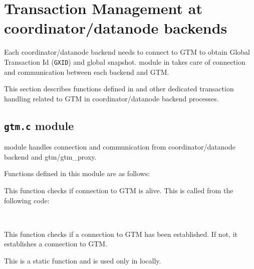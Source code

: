 %
%


\section{Transaction Management at coordinator/datanode backends}

  Each coordinator/datanode backend needs to connect to GTM to obtain Global Transaction
  Id (\texttt{GXID}) and global snapshot.
   module in  takes care of connection and
  communication between each backend and GTM.
  
  This section describes functions defined in  and other dedicated transaction
  handling related to GTM in coordinator/datanode backend processes.
  


\subsection{\texttt{gtm.c} module}
  
   module handles connection and communication from coordinator/datanode
  backend and gtm/gtm\_proxy.
  
  Functions defined in this module are as follows:
  
  
      This function checks if connection to GTM is alive.
	  This is called from the following code:
      
      \FuncRefHdr
		  \\ \hline
      \FuncRefTrailor
  
  
  
      This function checks if a connection to GTM has been established.
	  If not, it establishes a connection to GTM.
      
      This is a static function and is used only in  locally.
  
